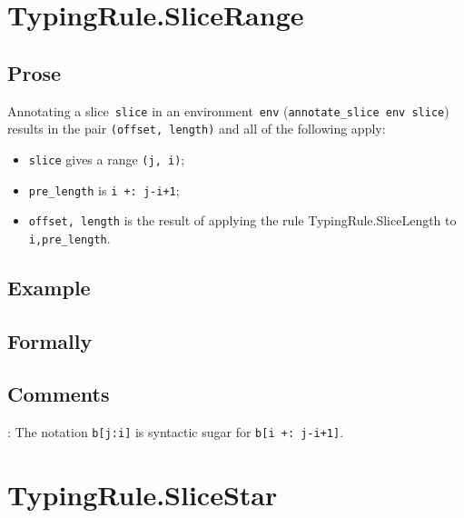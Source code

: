 \documentclass{book}
\begin{document}
\begin{itemize}

\section{TypingRule.SliceRange \label{sec:TypingRule.SliceRange}}

  \subsection{Prose}
      Annotating a slice~\texttt{slice} in an environment~\texttt{env}
(\texttt{annotate\_slice env slice}) results in the pair \texttt{(offset,
length)} and all of the following apply:
   \begin{itemize}
   \item \texttt{slice} gives a range \texttt{(j, i)};
   \item \texttt{pre\_length} is \texttt{i +: j-i+1};
   \item \texttt{offset, length} is the result of applying the rule TypingRule.SliceLength to \texttt{i,pre\_length}.
   \end{itemize}

  \subsection{Example}



\begin{emptyformal}
    \subsection{Formally}
\end{emptyformal}

\subsection{Comments}
    : The notation \texttt{b[j:i]} is syntactic sugar for \texttt{b[i +: j-i+1]}.

\section{TypingRule.SliceStar \label{sec:TypingRule.SliceStar}}


\end{itemize}
\end{document}
